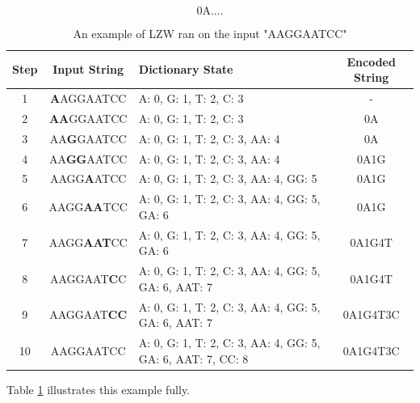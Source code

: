 \documentclass[12pt,twoside]{reedthesis}
\begin{document}
\[\text{0A....}\]
\begin{table}
\begin{tabular}{ | c | c | p{} | c | }
\hline
\textbf{Step} & \textbf{Input String} & \textbf{Dictionary State} & \textbf{Encoded String} \\
\hline
1 & \textbf{A}AGGAATCC & {A: 0, G: 1, T: 2, C: 3} & - \\
\hline
2 & \textbf{AA}GGAATCC & {A: 0, G: 1, T: 2, C: 3} & 0A \\
\hline
3 & AA\textbf{G}GAATCC & {A: 0, G: 1, T: 2, C: 3, AA: 4} & 0A  \\
\hline
4 & AA\textbf{GG}AATCC & {A: 0, G: 1, T: 2, C: 3, AA: 4} & 0A1G   \\
\hline
5 & AAGG\textbf{A}ATCC & {A: 0, G: 1, T: 2, C: 3, AA: 4, GG: 5} & 0A1G \\
\hline
6 & AAGG\textbf{AA}TCC & {A: 0, G: 1, T: 2, C: 3, AA: 4, GG: 5, GA: 6} & 0A1G  \\
\hline
7 & AAGG\textbf{AAT}CC & {A: 0, G: 1, T: 2, C: 3, AA: 4, GG: 5, GA: 6} & 0A1G4T  \\
\hline
8 & AAGGAAT\textbf{C}C & {A: 0, G: 1, T: 2, C: 3, AA: 4, GG: 5, GA: 6, AAT: 7} & 0A1G4T \\
\hline
9 & AAGGAAT\textbf{CC} & {A: 0, G: 1, T: 2, C: 3, AA: 4, GG: 5, GA: 6, AAT: 7} & 0A1G4T3C \\
\hline
10 & AAGGAATCC & {A: 0, G: 1, T: 2, C: 3, AA: 4, GG: 5, GA: 6, AAT: 7, CC: 8} & 0A1G4T3C \\
\hline
\end{tabular}
\caption{ An example of LZW ran on the input "AAGGAATCC"}
\label{tab:lzwexample}
\end{table}
Table \ref{tab:lzwexample} illustrates this example fully.
\end{document}
